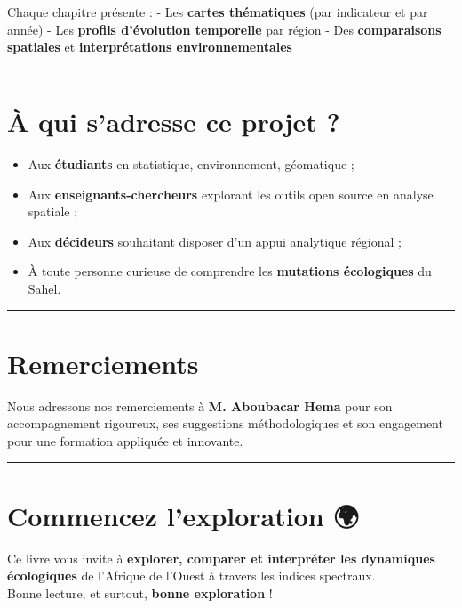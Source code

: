 \documentclass[
]{book}
\providecommand{\tightlist}{%
  \setlength{\itemsep}{0pt}\setlength{\parskip}{0pt}}
\begin{document}
Chaque chapitre présente :
- Les \textbf{cartes thématiques} (par indicateur et par année)
- Les \textbf{profils d'évolution temporelle} par région
- Des \textbf{comparaisons spatiales} et \textbf{interprétations environnementales}

\begin{center}\rule{0.5\linewidth}{0.5pt}\end{center}

\section{À qui s'adresse ce projet ?}\label{uxe0-qui-sadresse-ce-projet}

\begin{itemize}
\tightlist
\item
  Aux \textbf{étudiants} en statistique, environnement, géomatique ;
\item
  Aux \textbf{enseignants-chercheurs} explorant les outils open source en analyse spatiale ;
\item
  Aux \textbf{décideurs} souhaitant disposer d'un appui analytique régional ;
\item
  À toute personne curieuse de comprendre les \textbf{mutations écologiques} du Sahel.
\end{itemize}

\begin{center}\rule{0.5\linewidth}{0.5pt}\end{center}

\section{Remerciements}\label{remerciements}

Nous adressons nos remerciements à \textbf{M. Aboubacar Hema} pour son accompagnement rigoureux, ses suggestions méthodologiques et son engagement pour une formation appliquée et innovante.

\begin{center}\rule{0.5\linewidth}{0.5pt}\end{center}

\section{Commencez l'exploration 🌍}\label{commencez-lexploration}

Ce livre vous invite à \textbf{explorer, comparer et interpréter les dynamiques écologiques} de l'Afrique de l'Ouest à travers les indices spectraux.\\
Bonne lecture, et surtout, \textbf{bonne exploration} !
\end{document}
